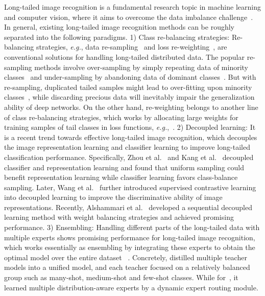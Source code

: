 \documentclass[10pt,journal,compsoc]{IEEEtran}
\newcommand{\eg}{\emph{e.g.}}
\begin{document}
Long-tailed image recognition is a fundamental research topic in machine learning and computer vision, where it aims to overcome the data imbalance challenge~\cite{zhihuatkde,he2009learning,cb-focal}. In general, existing long-tailed image recognition methods can be roughly separated into the following paradigms. 1) Class re-balancing strategies: Re-balancing strategies, \eg, data re-sampling~\cite{shen2016relay,japkowicz2002class} and loss re-weighting~\cite{zhihuaicdm,huang2016learning}, are conventional solutions for handling long-tailed distributed data. The popular re-sampling methods involve over-sampling by simply repeating data of minority classes~\cite{shen2016relay, buda2018systematic,  byrd2019effect} and under-sampling by abandoning data of dominant classes~\cite{japkowicz2002class,buda2018systematic,he2009learning}. But with re-sampling, duplicated tailed samples might lead to over-fitting upon minority classes~\cite{chawla2002smote,cb-focal}, while discarding precious data will inevitably impair the generalization ability of deep networks. On the other hand, {re-weighting} belongs to another line of class re-balancing strategies, which works by allocating large weights for training samples of tail classes in loss functions, \eg,~\cite{huang2016learning, wang2017learning}. 2) Decoupled learning: It is a recent trend towards effective long-tailed image recognition, which decouples the image representation learning and classifier learning to improve long-tailed classification performance. Specifically, Zhou et al.~\cite{bbn} and Kang et al.~\cite{decouple} decoupled classifier and representation learning and found that uniform sampling could benefit representation learning while classifier learning favors class-balance sampling. Later, Wang et al.~\cite{hybridxiushen} further introduced supervised contrastive learning into decoupled learning to improve the discriminative ability of image representations. Recently, Alshammari et al.~\cite{LTRweightbalancing} developed a sequential decoupled learning method with weight balancing strategies and achieved promising performance. 3) Ensembling: Handling different parts of the long-tailed data with multiple experts shows promising performance for long-tailed image recognition, which works essentially as ensembling by integrating these experts to obtain the optimal model over the entire dataset ~\cite{zhang2021test,xiang2020learning,cai2021ace}. Concretely, \cite{xiang2020learning} distilled multiple teacher models into a unified model, and each teacher focused on a relatively balanced group such as many-shot, medium-shot and few-shot classes. While for~\cite{wang2021longtailed}, it learned multiple distribution-aware experts by a dynamic expert routing module.
\end{document}
